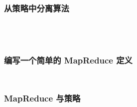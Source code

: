 \documentclass[./main.tex]{subfiles}
\begin{document}
\begin{lstlisting}[language=Haskell]

\end{lstlisting}

\subsubsection*{从策略中分离算法}

%

\begin{lstlisting}[language=Haskell]

\end{lstlisting}



\begin{lstlisting}[language=Haskell]

\end{lstlisting}



\begin{lstlisting}[language=Haskell]

\end{lstlisting}



\begin{lstlisting}[language=Haskell]

\end{lstlisting}

\subsubsection*{编写一个简单的 MapReduce 定义}

%

\begin{lstlisting}[language=Haskell]

\end{lstlisting}



\begin{lstlisting}[language=Haskell]

\end{lstlisting}

\subsubsection*{MapReduce 与策略}

%

\begin{lstlisting}[language=Haskell]

\end{lstlisting}
\end{document}
